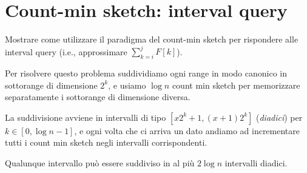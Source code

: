 \chapter{Count-min sketch: interval query}

\begin{problem*}
    Mostrare come utilizzare il paradigma del count-min sketch per rispondere alle
    interval query (i.e., approssimare \(\sum_{k=i}^j{F[k]}\)).
\end{problem*}

Per risolvere questo problema suddividiamo ogni range in modo canonico in
sottorange di dimensione $2^k$, e usiamo $\log n$ count min sketch per
memorizzare separatamente i sottorange di dimensione diversa.

La suddivisione avviene in intervalli di tipo $[x2^k+1,(x+1)2^k]$ (\emph{diadici})
per $k \in [0, \log n-1]$, e ogni volta che ci arriva un dato andiamo ad
incrementare tutti i count min sketch negli intervalli corrispondenti.

\begin{lemma}
    Qualunque intervallo può essere suddiviso in al più $2 \log{n}$ intervalli
    diadici.
\end{lemma}

